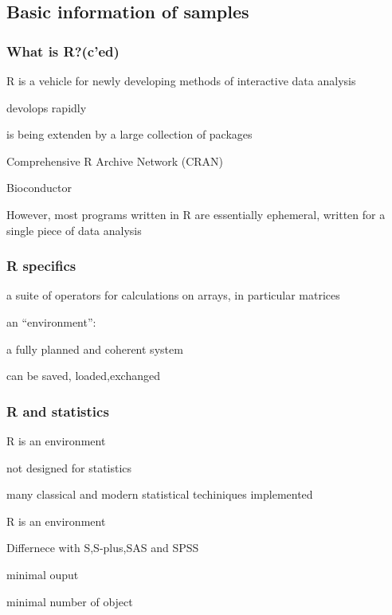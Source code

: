 \documentclass{beamer}
\begin{document}
\subsection{Basic information of samples}

   \begin{frame}
   \frametitle{What is R?(c'ed)}
	
    \ben
      \item R is a vehicle for newly developing methods of interactive data analysis
 
      		\bit
      			\item devolops rapidly
      			\item is being extenden by a large collection of packages
			    \bit
				\item Comprehensive R Archive Network (CRAN)
				\item Bioconductor
			    \eit
      			
      		\eit
      	\item However, most programs written in R are essentially ephemeral, written for a single piece of data analysis
    \een
  \end{frame}
  
 

   \begin{frame}
   \frametitle{R specifics}
	
    \bit
      \item a suite of operators for calculations on arrays, in particular matrices
 
      \item an ``environment'':
      
      		\bit
      			\item a fully planned and coherent system
      			\item can be saved, loaded,exchanged  			
      		\eit
    \eit
  \end{frame}
  
  \begin{frame}
  \frametitle{R and statistics}
   \bit
      \item R is an environment
	  \bit
	    \item not designed for statistics
	    \item many classical and modern statistical techiniques implemented
	  \eit \item R is an environment
	  \bit
      \item Differnece with S,S-plus,SAS and SPSS
	    \item minimal ouput
	    \item minimal number of object
	  \eit
      \eit
     \end{frame}
\end{document}
